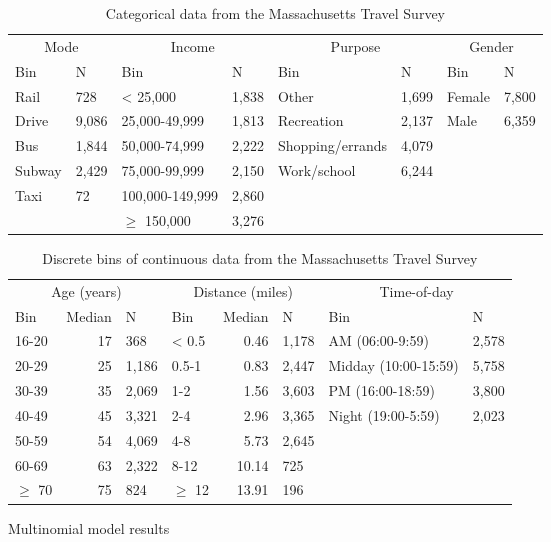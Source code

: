\documentclass{article}\usepackage[utf8]{inputenc}
\begin{document}
 \begin{table}[H]\centering\caption{Categorical data from the Massachusetts Travel Survey} \begingroup\fontsize{9}{11}\selectfont

\begin{tabular}{llllllll}
\toprule
\multicolumn{2}{c}{Mode} & \multicolumn{2}{c}{Income} & \multicolumn{2}{c}{Purpose} & \multicolumn{2}{c}{Gender} \\
\cmidrule(l{3pt}r{3pt}){1-2} \cmidrule(l{3pt}r{3pt}){3-4} \cmidrule(l{3pt}r{3pt}){5-6} \cmidrule(l{3pt}r{3pt}){7-8}
Bin & N & Bin & N & Bin & N & Bin & N\\
\midrule
Rail & 728 & < 25,000 & 1,838 & Other & 1,699 & Female & 7,800\\
Drive & 9,086 & 25,000-49,999 & 1,813 & Recreation & 2,137 & Male & 6,359\\
Bus & 1,844 & 50,000-74,999 & 2,222 & Shopping/errands & 4,079 &  & \\
Subway & 2,429 & 75,000-99,999 & 2,150 & Work/school & 6,244 &  & \\
Taxi & 72 & 100,000-149,999 & 2,860 &  &  &  & \\
 &  & $\geq$ 150,000 & 3,276 &  &  &  & \\
\bottomrule
\end{tabular}
\endgroup{} \end{table} \begin{table}[H]\centering\caption{Discrete bins of continuous data from the Massachusetts Travel Survey} \begingroup\fontsize{9}{11}\selectfont

\begin{tabular}{lrllrlll}
\toprule
\multicolumn{3}{c}{Age (years)} & \multicolumn{3}{c}{Distance (miles)} & \multicolumn{2}{c}{Time-of-day} \\
\cmidrule(l{3pt}r{3pt}){1-3} \cmidrule(l{3pt}r{3pt}){4-6} \cmidrule(l{3pt}r{3pt}){7-8}
Bin & Median & N & Bin & Median & N & Bin & N\\
\midrule
16-20 & 17 & 368 & < 0.5 & 0.46 & 1,178 & AM (06:00-9:59) & 2,578\\
20-29 & 25 & 1,186 & 0.5-1 & 0.83 & 2,447 & Midday (10:00-15:59) & 5,758\\
30-39 & 35 & 2,069 & 1-2 & 1.56 & 3,603 & PM (16:00-18:59) & 3,800\\
40-49 & 45 & 3,321 & 2-4 & 2.96 & 3,365 & Night (19:00-5:59) & 2,023\\
50-59 & 54 & 4,069 & 4-8 & 5.73 & 2,645 &  & \\
60-69 & 63 & 2,322 & 8-12 & 10.14 & 725 &  & \\
$\geq$ 70 & 75 & 824 & $\geq$ 12 & 13.91 & 196 &  & \\
\bottomrule
\end{tabular}
\endgroup{} \end{table} \begin{table}[H]\centering\setlength{\tabcolsep}{2pt}\caption{Multinomial model results} \begingroup\fontsize{8}{10}\selectfont


\end{table}
\end{document}
